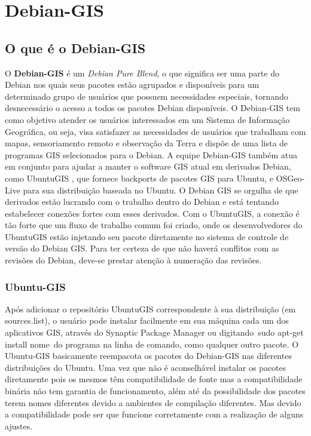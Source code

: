 \chapter{Debian-GIS}
\section{O que é o Debian-GIS}
O \textbf{Debian-GIS} é um \textit{Debian Pure Blend}, o que significa ser uma parte do Debian nos quais seus pacotes estão agrupados e disponíveis para um determinado grupo de usuários que possuem necessidades especiais, tornando desnecessário o acesso a todos os pacotes Debian disponíveis. O Debian-GIS tem como objetivo atender os usuários interessados em um Sistema de Informação Geográfica, ou seja, visa satisfazer as necessidades de usuários que trabalham com mapas, sensoriamento remoto e observação da Terra e dispõe de uma lista de programas GIS selecionados para o Debian.
A equipe Debian-GIS também atua em conjunto para ajudar a manter o software GIS atual em derivados Debian, como UbuntuGIS , que fornece backports de pacotes GIS para Ubuntu, e OSGeo-Live para sua distribuição baseada no Ubuntu.
O Debian GIS se orgulha de que derivados estão lucrando com o trabalho dentro do Debian e está tentando estabelecer conexões fortes com esses derivados. Com o UbuntuGIS, a conexão é tão forte que um fluxo de trabalho comum foi criado, onde os desenvolvedores do UbuntuGIS estão injetando seu pacote diretamente no sistema de controle de versão do Debian GIS. Para ter certeza de que não haverá conflitos com as revisões do Debian, deve-se prestar atenção à numeração das revisões.

\subsection{Ubuntu-GIS}
Após adicionar o repositório UbuntuGIS correspondente à sua distribuição (em sources.list), o usuário pode instalar facilmente em sua máquina cada um dos aplicativos GIS, através do Synaptic Package Manager ou digitando sudo apt-get install nome do programa na linha de comando, como qualquer outro pacote. 
O Ubuntu-GIS basicamente reempacota os pacotes do Debian-GIS nas diferentes distribuições do Ubuntu. Uma vez que não é aconselhável instalar os pacotes diretamente pois os mesmos têm compatibilidade de fonte mas a compatibilidade binária não tem garantia de funcionamento, além até da possibilidade dos pacotes terem nomes diferentes devido a ambientes de compilação diferentes. Mas devido a compatibilidade pode ser que funcione corretamente com a realização de alguns ajustes.

